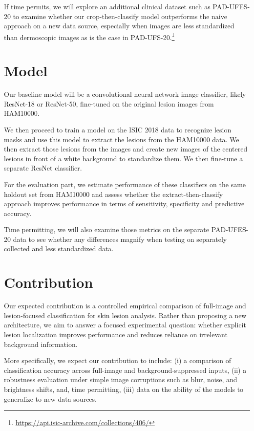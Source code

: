 \documentclass{article}
\begin{document}
If time permits, we will explore an additional clinical dataset such as PAD-UFES-20 to examine whether our crop-then-classify model outperforms the naive approach on a new data source, especially when images are less standardized than dermoscopic images as is the case in PAD-UFS-20.\footnote{\url{https://api.isic-archive.com/collections/406/}}


\section*{Model}
Our baseline model will be a convolutional neural network image classifier, likely ResNet-18 or ResNet-50, fine-tuned on the original lesion images from HAM10000. 

We then proceed to train a model on the ISIC 2018 data to recognize lesion masks and use this model to extract the lesions from the HAM10000 data. We then extract those lesions from the images and create new images of the centered lesions in front of a white background to standardize them. We then fine-tune a separate ResNet classifier.

For the evaluation part, we estimate performance of these classifiers on the same holdout set from HAM10000 and assess whether the extract-then-classify approach improves performance in terms of sensitivity, specificity and predictive accuracy.

Time permitting, we will also examine those metrics on the separate PAD-UFES-20 data to see whether any differences magnify when testing on separately collected and less standardized data.

\section*{Contribution}
Our expected contribution is a controlled empirical comparison of full-image and lesion-focused classification for skin lesion analysis. Rather than proposing a new architecture, we aim to answer a focused experimental question: whether explicit lesion localization improves performance and reduces reliance on irrelevant background information.

More specifically, we expect our contribution to include:
(i) a comparison of classification accuracy across full-image and background-suppressed inputs,
(ii) a robustness evaluation under simple image corruptions such as blur, noise, and brightness shifts, and, time permitting,
(iii) data on the ability of the models to generalize to new data sources.
\end{document}
